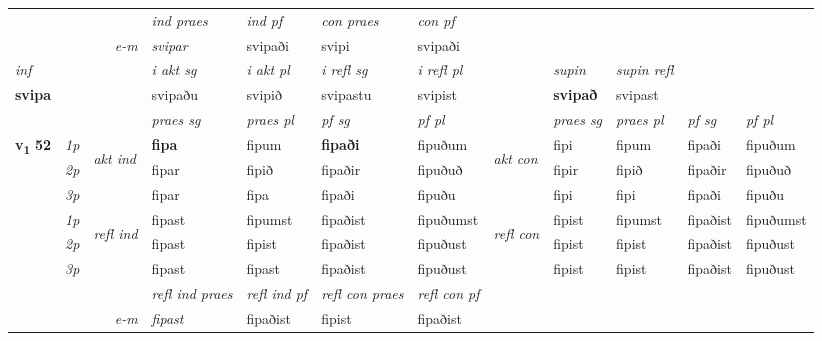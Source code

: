 \begin{longtable}[l]{X>{\footnotesize\itshape}llXXXXlXXXX}
   && &  \textit{ind praes} & \textit{ind pf} & \textit{con praes} & \textit{con pf} \\*
\multicolumn{3}{r}{\textit{e-m}} & svipar & svipaði & svipi & svipaði \\*

\cmidrule{4-7}
   {\textit{inf}} & &  & \textit{i akt sg} & \textit{i akt pl} & \textit{i refl sg} & \textit{i refl pl}  && \textit{supin} & \textit{supin refl}  \\*
  {\textbf{svipa}} & && svipaðu  & svipið & svipastu & svipist  &&  \textbf{svipað} & svipast  \\*

\midrule

 & &   & \textit{praes sg}  & \textit{praes pl}    & \textit{ pf sg} & \textit{pf pl} & & \textit{praes sg}  & \textit{praes pl}    & \textit{pf sg} & \textit{pf pl }  \\ \cmidrule{4-7} \cmidrule{9-12}
 \multirow{2}{*}{{{\textbf{v{\textsubscript{1}}} \Large{\textbf{52}}}}}  & 1p & \multirow{3}{*}{\begin{turn}{90}\textit{akt ind}\end{turn}} & \textbf{fipa} & fipum & \textbf{fipaði} & fipuðum & \multirow{3}{*}{\begin{turn}{90}\textit{akt con}\end{turn}} &fipi & fipum & fipaði & fipuðum\\*
 & 2p &  &  fipar  & fipið & fipaðir & fipuðuð & & fipir & fipið & fipaðir & fipuðuð \\*
 & 3p &  & fipar & fipa & fipaði & fipuðu & & fipi & fipi& fipaði & fipuðu \\*
\cmidrule{4-7} \cmidrule{9-12}
 & 1p & \multirow{3}{*}{\begin{turn}{90}\textit{refl ind}\end{turn}}  & fipast & fipumst & fipaðist & fipuðumst & \multirow{3}{*}{\begin{turn}{90}\textit{refl con}\end{turn}}  &fipist & fipumst & fipaðist & fipuðumst \\*
 & 2p &  & fipast & fipist & fipaðist & fipuðust & &fipist & fipist & fipaðist & fipuðust \\*
 & 3p  & & fipast & fipast & fipaðist & fipuðust & & fipist & fipist& fipaðist & fipuðust \\*
\cmidrule{4-7} \cmidrule{9-12}

 & && \textit{refl ind praes} & \textit{refl ind pf} & \textit{refl con praes} & \textit{refl con pf} \\*
\multicolumn{3}{r}{\textit{e-m}}& fipast & fipaðist & fipist & fipaðist \\*


\end{longtable}
